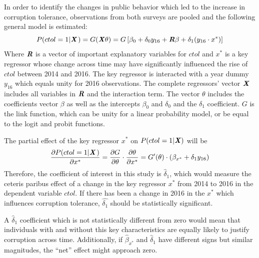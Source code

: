 \documentclass[floatsintext,man]{apa7}\usepackage[]{graphicx}\usepackage[]{color}
\begin{document}
In order to identify the changes in public behavior which led to the increase in corruption tolerance, observations from both surveys are pooled and the following general model is estimated: 
\begin{equation}
\label{eqn:genmod}
P(ctol = 1 | \textbf{\textit{X}} \hspace{0.04cm}) = G (\textbf{\textit{X}} \theta ) = G \left[ \beta_0 + \delta_0 y_{16} + \textbf{\textit{R}}\beta + \delta_1 (y_{16} \cdot x^*) \right]
\end{equation}
Where $\textbf{\textit{R}}$ is a vector of important explanatory variables for $ctol$ and $x^*$ is a key regressor whose change across time may have significantly influenced the rise of $ctol$ between 2014 and 2016. The key regressor is interacted with a year dummy $y_{16}$ which equals unity for 2016 observations. The complete regressors' vector $\textbf{\textit{X}}$ includes all variables in $\textbf{\textit{R}}$ and the interaction term. The vector $\theta$ includes the coefficients vector $\beta$ as well as the intercepts $\beta_0$ and $\delta_0$ and the $\delta_1$ coefficient. $G$ is the link function, which can be unity for a linear probability model, or be equal to the logit and probit functions. 

The partial effect of the key regressor $x^*$ on $P(ctol =1| \textbf{\textit{X}})$ will be
\begin{equation}
\label{eqn:keype}
\dfrac{\partial P(ctol = 1 | \textbf{\textit{X}} \hspace{0.04cm})}{\partial x^*} = \dfrac{\partial G}{\partial \theta} \cdot 
\dfrac{\partial \theta}{\partial x^*} = G'(\theta) \cdot (\beta_{x^*}+ \delta_1 y_{16})
\end{equation}
Therefore, the coefficient of interest in this study is $\hat{\delta}_1$, which would measure the ceteris paribus effect of a change in the key regressor $x^*$ from 2014 to 2016 in the dependent variable $ctol$. If there has been a change in 2016 in the $x^*$ which influences corruption tolerance, $\hat{\delta_1}$ should be statistically significant. 

A $\hat{\delta}_1$ coefficient which is not statistically different from zero would mean that individuals with and without this key characteristics are equally likely to justify corruption across time. Additionally, if $\hat{\beta}_{x^*}$ and $\hat{\delta}_1$ have different signs but similar magnitudes, the \enquote{net} effect might approach zero. 
\end{document}

